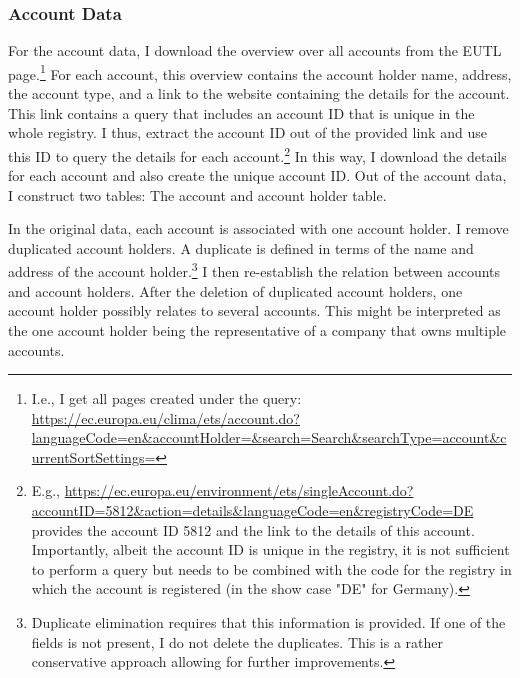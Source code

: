 \documentclass[authoryear]{elsarticle}
\begin{document}
\subsubsection{Account Data}	
For the account data, I download the overview over all accounts from the EUTL page.\footnote{I.e., I get all pages created under the query: \url{https://ec.europa.eu/clima/ets/account.do?languageCode=en&accountHolder=&search=Search&searchType=account&currentSortSettings=}} For each account, this overview contains the account holder name, address, the account type, and a link to the website containing the details for the account. This link contains a query that includes an account ID that is unique in the whole registry. I thus, extract the  account ID out of the provided link and use this ID to query the details for each account.\footnote{E.g., \url{https://ec.europa.eu/environment/ets/singleAccount.do?accountID=5812&action=details&languageCode=en&registryCode=DE} provides the account ID 5812 and the link to the details of this account. Importantly, albeit the account ID is unique in the registry, it is not sufficient to perform a query but needs to be combined with the code for the registry in which the account is registered (in the show case "DE" for Germany).} In this way, I download the details for each account and also create the unique account ID. Out of the account data, I construct two tables: The account and account holder table.

In the original data, each account is associated with one account holder. I remove duplicated account holders. A duplicate is defined in terms of the name and address of the account holder.\footnote{Duplicate elimination requires that this information is provided. If one of the fields is not present, I do not delete the duplicates. This is a rather conservative approach allowing for further improvements.} I then re-establish the relation between accounts and account holders. After the deletion of duplicated account holders, one account holder possibly relates to several accounts. This might be interpreted as the one account holder being the representative of a company that owns multiple accounts.
\end{document}
